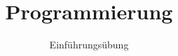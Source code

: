 
\title{Programmierung}
\subtitle{Einführungsübung}


    \begin{frame}
        \frontframe
    \end{frame}

    \begin{frame}
    \end{frame}

